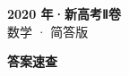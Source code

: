 \documentclass[zihao=-4, a4paper]{ctexart}
\begin{document}
\begin{center}
  {\Large\bfseries 2020 年·新高考Ⅱ卷}\\[4pt]
  {\large 数学 · 简答版}
\end{center}
\medskip
{}

\clearpage
{}
\begin{center}{\Large\bfseries 答案速查}\end{center}
\medskip

\end{document}
